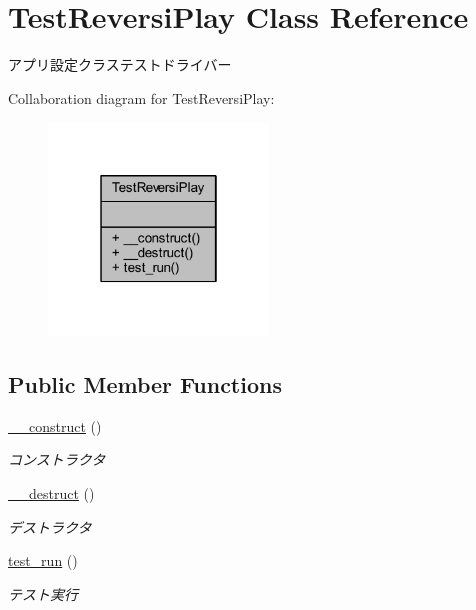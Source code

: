 \hypertarget{class_test_reversi_play}{}\section{Test\+Reversi\+Play Class Reference}
\label{class_test_reversi_play}


アプリ設定クラステストドライバー  




Collaboration diagram for Test\+Reversi\+Play\+:\nopagebreak
\begin{figure}[H]
\begin{center}
\leavevmode
\includegraphics[width=166pt]{class_test_reversi_play__coll__graph}
\end{center}
\end{figure}
\subsection*{Public Member Functions}
\begin{DoxyCompactItemize}
\item 
\hyperlink{class_test_reversi_play_a095c5d389db211932136b53f25f39685}{\+\_\+\+\_\+construct} ()
\begin{DoxyCompactList}\small\item\em コンストラクタ \end{DoxyCompactList}\item 
\hyperlink{class_test_reversi_play_a421831a265621325e1fdd19aace0c758}{\+\_\+\+\_\+destruct} ()
\begin{DoxyCompactList}\small\item\em デストラクタ \end{DoxyCompactList}\item 
\hyperlink{class_test_reversi_play_a9b029832cfdf19c0ef36b1f5ef7b7735}{test\+\_\+run} ()
\begin{DoxyCompactList}\small\item\em テスト実行 \end{DoxyCompactList}\end{DoxyCompactItemize}


